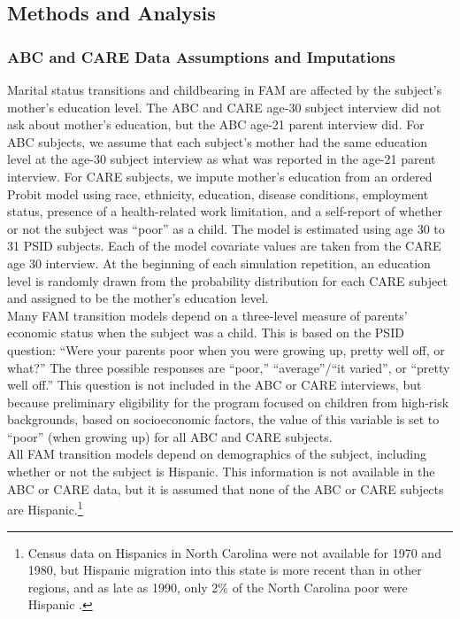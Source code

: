 \subsection{Methods and Analysis}

\subsubsection{ABC and CARE Data Assumptions and Imputations}
\label{section:FAM_ABC_impute}


\noindent Marital status transitions and childbearing in FAM are affected by the subject's mother's education level. The ABC and CARE age-30 subject interview did not ask about mother's education, but the ABC age-21 parent interview did.
For ABC subjects, we assume that each subject's mother had the same education level at the age-30 subject interview as what was reported in the age-21 parent interview. For CARE subjects, we impute mother's education from an ordered Probit model using race, ethnicity, education, disease conditions, employment status, presence of a health-related work limitation, and a self-report of whether or not the subject was ``poor'' as a child.  The model is estimated using age 30 to 31 PSID subjects.  Each of the model covariate values are taken from the CARE age 30 interview. At the beginning of each simulation repetition, an education level is randomly drawn from the probability distribution for each CARE subject and assigned to be the mother's education level.  \\

\noindent Many FAM transition models depend on a three-level measure of parents' economic status when the subject was a child.
This is based on the PSID question: ``Were your parents poor when you were growing up, pretty well off, or what?''
The three possible responses are ``poor,'' ``average''/``it varied'', or ``pretty well off.''
This question is not included in the ABC or CARE interviews, but because preliminary eligibility for the program focused on children from high-risk backgrounds, based on socioeconomic factors, the value of this variable is set to ``poor'' (when growing up) for all ABC and CARE subjects. \\

\noindent All FAM transition models depend on demographics of the subject, including whether or not the subject is Hispanic.
This information is not available in the ABC or CARE data, but it is assumed that none of the ABC or CARE subjects are Hispanic.\footnote{Census data on Hispanics in North Carolina were not available for 1970 and 1980, but Hispanic migration into this state is more recent than in other regions, and as late as 1990, only 2\% of the North Carolina poor were Hispanic \citep{Johnson_2003_Changing-Poverty}.} \\

